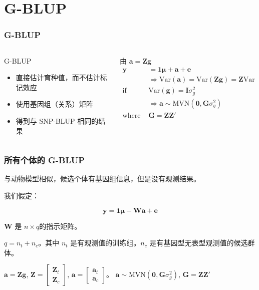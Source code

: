 \documentclass[serif,aspectratio=169]{beamer}
\begin{document}
\section{G-BLUP}
\begin{frame}
  \frametitle{G-BLUP}
  \begin{columns}
    \begin{column}{.5\textwidth}
      \begin{block}{G-BLUP}
        \begin{itemize}
        \item 直接估计育种值，而不估计标记效应
        \item 使用基因组（关系）矩阵
        \item 得到与 SNP-BLUP 相同的结果
        \end{itemize}
      \end{block}
    \end{column}

    \pause
    \begin{column}{.5\textwidth}
      \begin{block}{由 $\mathbf{a=Zg}$}
        \begin{align*}
          \mathbf{y} &=\mathbf{1\mu+a+e}\\
          &\Rightarrow\mathrm{Var}(\mathbf{a})=\mathrm{Var}(\mathbf{Zg})=\mathbf{Z}\mathrm{Var}(\mathbf{g})\mathbf{Z}'\\
          \textrm{if } & \mathrm{Var}(\mathbf{g}) =\mathbf{I}\sigma_g^2\\
          & \Rightarrow\mathbf{a}\sim\mathrm{MVN}(\mathbf{0,G}\sigma_g^2)\\
          \textrm{where } &\mathbf{G=ZZ}'
        \end{align*}
      \end{block}
    \end{column}
  \end{columns}
\end{frame}


\begin{frame}
  \frametitle{所有个体的 G-BLUP}
  与动物模型相似，候选个体有基因组信息，但是没有观测结果。

  我们假定：

  $$\mathbf{y=1\mu+Wa+e}$$

  $\mathbf{W}$ 是 $n\times q$的指示矩阵。

  $q=n_t+n_c$。其中 $n_t$ 是有观测值的训练组。$n_c$ 是有基因型无表型观测值的候选群体。

  $\mathbf{a=Zg}$, $\mathbf{Z}=\left[\begin{array}{c}\mathbf{Z}_t\\\mathbf{Z}_c\end{array}\right]$, $\mathbf{a} = \left[\begin{array}{c}\mathbf{a}_t\\\mathbf{a}_c\end{array}\right]$。  \pause$\mathbf{a}\sim\mathrm{MVN}(\mathbf{0,G}\sigma_g^2)$, $\mathbf{G=ZZ}'$
\end{frame}
\end{document}
